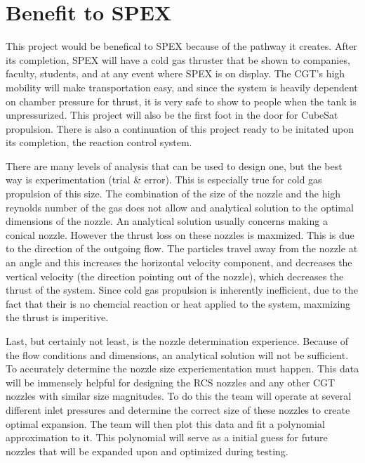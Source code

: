 \documentclass[conference]{IEEEtran} %
\begin{document}
\section{Benefit to SPEX}
\label{sec:benefit}

This project would be benefical to SPEX because of the pathway it creates. After its completion, SPEX will have a cold gas thruster that
be shown to companies, faculty, students, and at any event where SPEX is on display. The CGT's high mobility will make transportation easy, and since
the system is heavily dependent on chamber pressure for thrust, it is very safe to show to people when the tank is unpressurized. This project
will also be the first foot in the door for CubeSat propulsion. There is also a continuation of this project ready to be initated upon its completion, the
reaction control system.

There are many levels of
analysis that can be used to design one, but the best way is experimentation (trial \& error). This is especially true for cold gas propulsion of this
size. The combination of the size of the nozzle and the high reynolds number of the gas does not allow and analytical solution to the optimal dimensions
of the nozzle. An analytical solution usually concerns making a conical nozzle. However the thrust loss on these nozzles is maxmized. This is due to the
direction of the outgoing flow. The particles travel away from the nozzle at an angle and this increases the horizontal velocity component, and decreases the
vertical velocity (the direction pointing out of the nozzle), which decreases the thrust of the system. Since cold gas propulsion is inherently inefficient, due
to the fact that their is no chemcial reaction or heat applied to the system, maxmizing the thrust is imperitive.

Last, but certainly not least, is the nozzle determination experience. Because of the flow conditions and dimensions, an analytical solution will not be sufficient. To accurately determine
the nozzle size experiementation must happen. This data will be immensely helpful for designing the RCS nozzles and any other CGT nozzles with similar
size magnitudes. To do this the team will operate at several different inlet pressures and determine the correct size of these nozzles to create optimal expansion.
The team will then plot this data and fit a polynomial approximation to it. This polynomial will serve as a initial guess for future nozzles that will be
expanded upon and optimized during testing.
\end{document}
